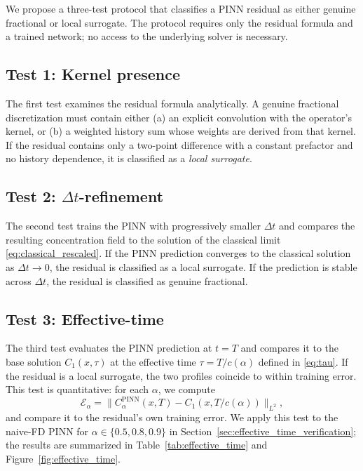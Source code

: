 \documentclass[11pt]{article}
\begin{document}
We propose a three-test protocol that classifies a PINN residual as either genuine fractional or local surrogate. The protocol requires only the residual formula and a trained network; no access to the underlying solver is necessary.

\subsection{Test 1: Kernel presence}

The first test examines the residual formula analytically. A genuine fractional discretization must contain either (a) an explicit convolution with the operator's kernel, or (b) a weighted history sum whose weights are derived from that kernel. If the residual contains only a two-point difference with a constant prefactor and no history dependence, it is classified as a \emph{local surrogate}.

\subsection{Test 2: \(\Delta t\)-refinement}
\label{sec:dt_refinement}

The second test trains the PINN with progressively smaller \(\Delta t\) and compares the resulting concentration field to the solution of the classical limit \eqref{eq:classical_rescaled}. If the PINN prediction converges to the classical solution as \(\Delta t\to 0\), the residual is classified as a local surrogate. If the prediction is stable across \(\Delta t\), the residual is classified as genuine fractional.

\subsection{Test 3: Effective-time}
\label{sec:effective_time_test}

The third test evaluates the PINN prediction at \(t=T\) and compares it to the base solution \(C_1(x,\tau)\) at the effective time \(\tau = T/c(\alpha)\) defined in \eqref{eq:tau}. If the residual is a local surrogate, the two profiles coincide to within training error. This test is quantitative: for each \(\alpha\), we compute
\begin{equation}
\mathcal{E}_\alpha = \|C_\alpha^{\mathrm{PINN}}(x,T) - C_1(x, T/c(\alpha))\|_{L^2},
\end{equation}
and compare it to the residual's own training error. We apply this test to the naive-FD PINN for \(\alpha \in \{0.5, 0.8, 0.9\}\) in Section~\ref{sec:effective_time_verification}; the results are summarized in Table~\ref{tab:effective_time} and Figure~\ref{fig:effective_time}.
\end{document}
